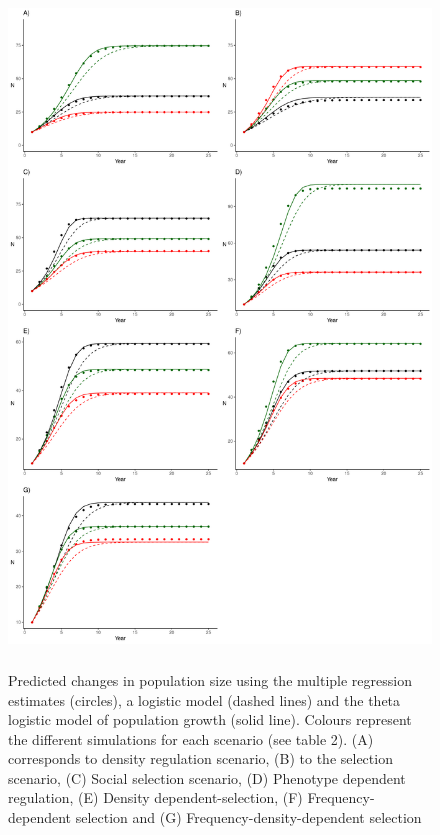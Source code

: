 \documentclass{article}
\begin{document}
\begin{figure}[h] 
	\centering
	\includegraphics[width=12cm, height=18cm]{Figures/FigS4.pdf}
	\caption{Predicted changes in population size using the multiple regression estimates (circles), a logistic model (dashed lines) and the theta logistic model of population growth (solid line). Colours represent the different simulations for each scenario (see table 2). (A) corresponds to density regulation scenario, (B) to the selection scenario, (C) Social selection scenario, (D) Phenotype dependent regulation, (E) Density dependent-selection, (F) Frequency-dependent selection and (G) Frequency-density-dependent selection} 
	\label{fig:growth}
\end{figure}


 
\end{document}
